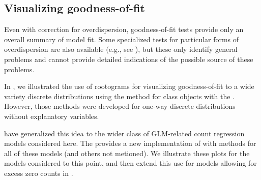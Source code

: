 \documentclass[11pt]{book}\usepackage[]{graphicx}\usepackage[]{color}
\begin{document}
\subsection{Visualizing goodness-of-fit}\label{sec:glm-visfit}

Even with correction for overdispersion, goodness-of-fit tests provide only an overall
summary of model fit.  Some specialized tests for particular forms of overdispersion
are also available (e.g., see \citet[]{CameronTrivedi:1998}),
but these only identify general problems and cannot provide detailed indications of
the possible source of these problems.

In , we illustrated the use of rootograms for visualizing goodness-of-fit
to a wide variety discrete distributions using the  method for
class  objects with the .  However, those methods were
developed for one-way discrete distributions without explanatory variables.

\citet{KleiberZeileis:2014} have generalized this idea to the wider class of 
GLM-related count regression models considered here.
The  provides a new implementation of 
with methods for all of these models (and others not metioned).
We illustrate these plots for the models considered to this point, and then extend
this use for models allowing for excess zero counts in .
\end{document}
